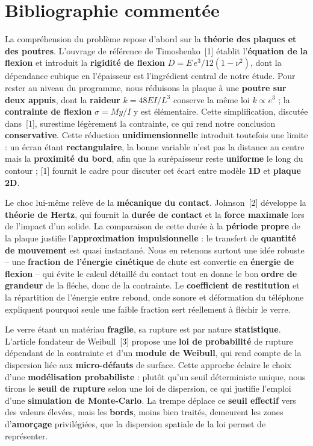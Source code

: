 \documentclass[11pt,a4paper]{article}
\begin{document}
\section{Bibliographie commentée}
La compréhension du problème repose d'abord sur la \textbf{théorie des plaques
et des poutres}. L'ouvrage de référence de Timoshenko~[1] établit l'\textbf{équation
de la flexion} et introduit la \textbf{rigidité de flexion}
$D = E\,e^{3}/12(1-\nu^{2})$, dont la dépendance cubique en l'épaisseur est
l'ingrédient central de notre étude. Pour rester au niveau du programme, nous
réduisons la plaque à une \textbf{poutre sur deux appuis}, dont la
\textbf{raideur} $k = 48EI/L^{3}$ conserve la même loi $k \propto e^{3}$ ; la
\textbf{contrainte de flexion} $\sigma = My/I$ y est élémentaire. Cette
simplification, discutée dans~[1], surestime légèrement la contrainte, ce qui
rend notre conclusion \textbf{conservative}. Cette réduction
\textbf{unidimensionnelle} introduit toutefois une limite : un écran étant
\textbf{rectangulaire}, la bonne variable n'est pas la distance au centre mais
la \textbf{proximité du bord}, afin que la surépaisseur reste \textbf{uniforme}
le long du contour ; [1] fournit le cadre pour discuter cet écart entre modèle
\textbf{1D} et \textbf{plaque 2D}.

Le choc lui-même relève de la \textbf{mécanique du contact}. Johnson~[2]
développe la \textbf{théorie de Hertz}, qui fournit la \textbf{durée de contact}
et la \textbf{force maximale} lors de l'impact d'un solide. La comparaison de
cette durée à la \textbf{période propre} de la plaque justifie
l'\textbf{approximation impulsionnelle} : le transfert de \textbf{quantité de
mouvement} est quasi instantané. Nous en retenons surtout une idée robuste --
une \textbf{fraction de l'énergie cinétique} de chute est convertie en
\textbf{énergie de flexion} -- qui évite le calcul détaillé du contact tout en
donne le bon \textbf{ordre de grandeur} de la fléche, donc de la contrainte. Le
\textbf{coefficient de restitution} et la répartition de l'énergie entre rebond,
onde sonore et déformation du téléphone expliquent pourquoi seule une faible
fraction sert réellement à fléchir le verre.

Le verre étant un matériau \textbf{fragile}, sa rupture est par nature
\textbf{statistique}. L'article fondateur de Weibull~[3] propose une \textbf{loi
de probabilité} de rupture dépendant de la contrainte et d'un \textbf{module de
Weibull}, qui rend compte de la dispersion liée aux \textbf{micro-défauts} de
surface. Cette approche éclaire le choix d'une \textbf{modélisation
probabiliste} : plutôt qu'un seuil déterministe unique, nous tirons le
\textbf{seuil de rupture} selon une loi de dispersion, ce qui justifie l'emploi
d'une \textbf{simulation de Monte-Carlo}. La trempe déplace ce \textbf{seuil
effectif} vers des valeurs élevées, mais les \textbf{bords}, moins bien traités,
demeurent les zones d'\textbf{amorçage} privilégiées, que la dispersion spatiale
de la loi permet de représenter.
\end{document}
